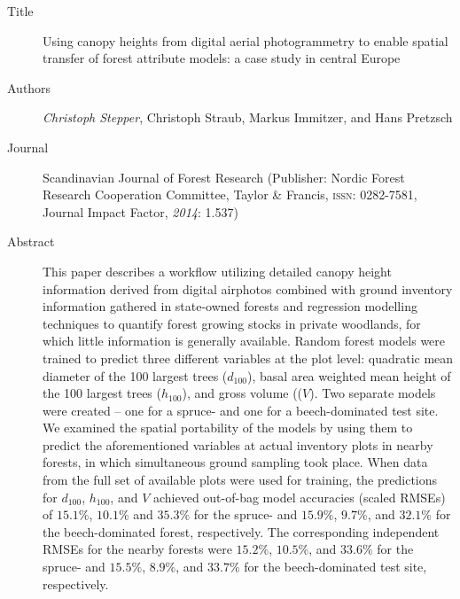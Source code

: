 \begin{description}
	\item[Title] Using canopy heights from digital aerial photogrammetry to enable spatial transfer of forest attribute models: 
		a case study in central Europe
	\item[Authors] \emph{Christoph Stepper}, Christoph Straub, Markus Immitzer, and Hans Pretzsch
	\item[Journal] Scandinavian Journal of Forest Research (Publisher: Nordic Forest Research Cooperation Committee, 
		Taylor \& Francis, \textsc{issn}: 0282-7581, Journal Impact Factor, \emph{2014}: 1.537)
	\item[Abstract] This paper describes a workflow utilizing detailed canopy height information derived from digital airphotos
		 combined with ground inventory information gathered in state-owned forests and regression modelling techniques to 
		 quantify forest growing stocks in private woodlands, for which little information is generally available. 
		 Random forest models were trained to predict three different variables at the plot level: 
		 quadratic mean diameter of the 100 largest trees ($d_{100}$), basal area weighted mean height of the 100 largest trees ($h_{100}$), and gross volume (($V$). 
		 Two separate models were created -- one for a spruce- and one for a beech-dominated test site. 
		 We examined the spatial portability of the models by using them to predict the aforementioned variables at actual inventory plots in nearby forests, 
		 in which simultaneous ground sampling took place. When data from the full set of available plots were used for training, 
		 the predictions for $d_{100}$, $h_{100}$, and $V$ achieved out-of-bag model accuracies (scaled RMSEs) 
		 of $15.1\%$, $10.1\%$ and $35.3\%$ for the spruce- and $15.9\%$, $9.7\%$,
		 and $32.1\%$ for the beech-dominated forest, respectively.
		 The corresponding independent RMSEs for the nearby forests were $15.2\%$, $10.5\%$, and $33.6\%$ for the spruce-
		 and $15.5\%$, $8.9\%$, and $33.7\%$ for the beech-dominated test site, respectively.

\end{description}
